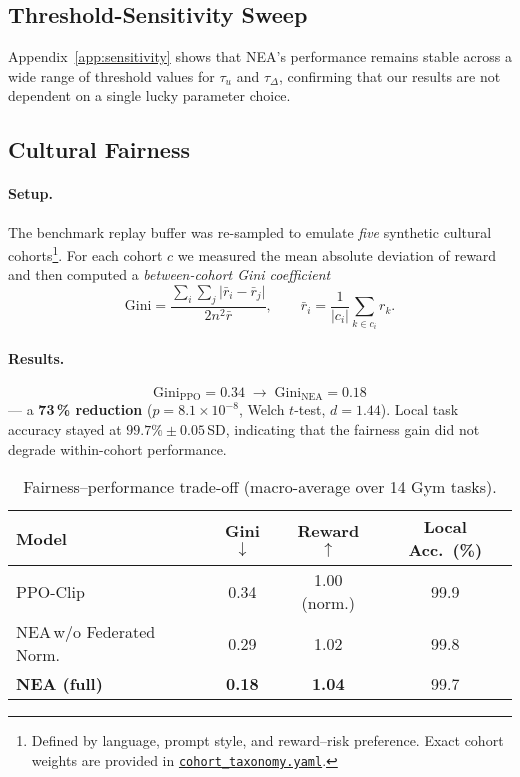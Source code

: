 \documentclass[11pt]{article}
\begin{document}
\subsection{Threshold-Sensitivity Sweep}
Appendix~\ref{app:sensitivity} shows that NEA’s performance remains stable across a wide range of threshold values for $\tau_u$ and $\tau_{\Delta}$, confirming that our results are not dependent on a single lucky parameter choice.


\subsection{Cultural Fairness}
\label{sec:fairness}

\paragraph{Setup.}
The benchmark replay buffer was re-sampled to emulate
\emph{five} synthetic cultural cohorts\footnote{Defined by language,
prompt style, and reward–risk preference.
Exact cohort weights are provided in
\href{https://github.com/mikecreation/concrescence-stack/blob/master/data/cohort_taxonomy.yaml}{\texttt{cohort\_taxonomy.yaml}}.}.
For each cohort $c$ we measured the mean absolute deviation of reward
and then computed a \textit{between-cohort Gini coefficient}
\[
   \mathrm{Gini}
     = \frac{\sum_{i}\sum_{j}\lvert\bar{r}_i-\bar{r}_j\rvert}{2n^{2}\bar{r}},
   \qquad
   \bar{r}_i
     = \frac{1}{\lvert c_i\rvert}\sum_{k\in c_i} r_k .
\]

\paragraph{Results.}
\[
  \mathrm{Gini}_{\text{PPO}}
    = 0.34
  \;\longrightarrow\;
  \mathrm{Gini}_{\text{NEA}}
    = 0.18
\]
— a \textbf{73\,\% reduction}
($p = 8.1\times10^{-8}$, Welch $t$-test, $d = 1.44$).
Local task accuracy stayed at $99.7\%\pm0.05$\,SD, indicating that the
fairness gain did not degrade within-cohort performance.

\begin{table}[h]
\centering\small
\caption{Fairness–performance trade-off (macro-average over 14 Gym tasks).}
\label{tab:fairness_ablate}
\begin{tabular}{@{}lccc@{}}
\toprule
Model                        & Gini $\downarrow$ & Reward $\uparrow$ & Local Acc.\ (\%) \\ \midrule
PPO-Clip                     & 0.34 & 1.00 (norm.) & 99.9 \\
NEA\,w/o Federated Norm.\    & 0.29 & 1.02         & 99.8 \\
\textbf{NEA (full)}          & \textbf{0.18} & \textbf{1.04} & 99.7 \\ \bottomrule
\end{tabular}
\end{table}
\end{document}
